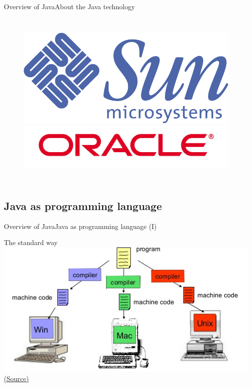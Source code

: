 \documentclass[10pt,compress]{beamer} %
\begin{document}
\begin{frame}{Overview of Java}{About the Java technology}
\begin{columns}
\begin{figure}[t]
\begin{center}
			\bigskip
		    \includegraphics[width=0.6\linewidth]{figs/Sun}\\
			\bigskip
		    \includegraphics[width=0.6\linewidth]{figs/oracle}
		\end{center}
   	 	\end{figure}
    \end{columns}

\end{frame}

\subsection[Java as programming language]{Java as programming language}
\begin{frame}{Overview of Java}{Java as programming language (I)}
	\begin{center}
	The standard way\\
	\bigskip
	\includegraphics[width=0.8\linewidth]{figs/compilacion}\\
	\scriptsize{\href{http://es.slideshare.net/darokoblog/an-introduction-to-java-programming-language-forbeginnersjava-programming-tutorials}{(Source)}}
	\end{center}
\end{frame}
\end{document}
